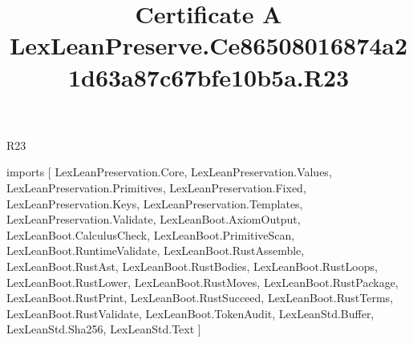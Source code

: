 \begin{lexlean}{R23}
\title{Certificate A LexLeanPreserve.Ce86508016874a21d63a87c67bfe10b5a.R23}
\begin{coremodule}
imports [
  LexLeanPreservation.Core,
  LexLeanPreservation.Values,
  LexLeanPreservation.Primitives,
  LexLeanPreservation.Fixed,
  LexLeanPreservation.Keys,
  LexLeanPreservation.Templates,
  LexLeanPreservation.Validate,
  LexLeanBoot.AxiomOutput,
  LexLeanBoot.CalculusCheck,
  LexLeanBoot.PrimitiveScan,
  LexLeanBoot.RuntimeValidate,
  LexLeanBoot.RustAssemble,
  LexLeanBoot.RustAst,
  LexLeanBoot.RustBodies,
  LexLeanBoot.RustLoops,
  LexLeanBoot.RustLower,
  LexLeanBoot.RustMoves,
  LexLeanBoot.RustPackage,
  LexLeanBoot.RustPrint,
  LexLeanBoot.RustSucceed,
  LexLeanBoot.RustTerms,
  LexLeanBoot.RustValidate,
  LexLeanBoot.TokenAudit,
  LexLeanStd.Buffer,
  LexLeanStd.Sha256,
  LexLeanStd.Text
]


\end{coremodule}
\end{lexlean}
